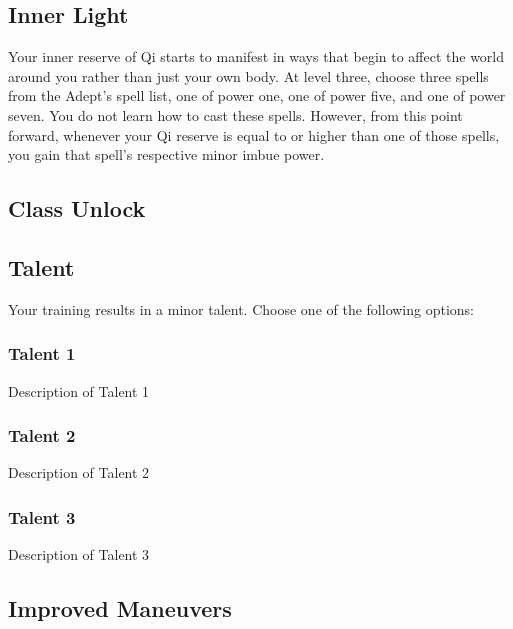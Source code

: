 \subsection*{Inner Light}

Your inner reserve of Qi starts to manifest in ways that begin to affect the world around you rather than just your own body. At level three, choose three spells from the Adept's spell list, one of power one, one of power five, and one of power seven. You do not learn how to cast these spells. However, from this point forward, whenever your Qi reserve is equal to or higher than one of those spells, you gain that spell's respective minor imbue power.

\vspace{.1 in}

\subsection*{Class Unlock}
\lipsum[1]

\vspace{.1 in}

\subsection*{Talent}
Your training results in a minor talent. Choose one of the following options:

\subsubsection{Talent 1}
Description of Talent 1

\subsubsection{Talent 2}
Description of Talent 2

\subsubsection{Talent 3}
Description of Talent 3

\vspace{.1 in}

\subsection*{Improved Maneuvers}
\lipsum[1]

\vspace{.1 in}

